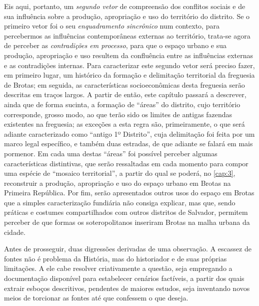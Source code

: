 Eis aqui, portanto, um \textit{segundo vetor} de compreensão dos conflitos sociais e de sua influência sobre a produção, apropriação e uso do território do distrito. Se o primeiro vetor foi o seu \textit{enquadramento sincrônico} num contexto, para percebermos as influências contemporâneas externas ao território, trata-se agora de perceber as \textit{contradições em processo}, para que o espaço urbano e sua produção, apropriação e uso resultem da confluência entre as influências externas e as contradições internas. Para caracterizar este segundo vetor será preciso fazer, em primeiro lugar, um histórico da formação e delimitação territorial da freguesia de Brotas; em seguida, as características socioeconômicas desta freguesia serão descritas em traços largos. A partir de então, este capítulo passará a descrever, ainda que de forma sucinta, a formação de ``áreas'' do distrito, cujo território corresponde, grosso modo, ao que terão sido os limites de antigas fazendas existentes na freguesia; as exceções a esta regra são, primeiramente, o que será adiante caracterizado como ``antigo 1º Distrito'', cuja delimitação foi feita por um marco legal específico, e também duas estradas, de que adiante se falará em mais pormenor. Em cada uma destas ``áreas'' foi possível perceber algumas características distintivas, que serão ressaltadas em cada momento para compor uma espécie de ``mosaico territorial'', a partir do qual se poderá, no \autoref{cap:3}, reconstruir a produção, apropriação e uso do espaço urbano em Brotas na Primeira República. Por fim, serão apresentados outros usos do espaço em Brotas que a simples caracterização fundiária não consiga explicar, mas que, sendo práticas e costumes compartilhados com outros distritos de Salvador, permitem perceber de que formas os soteropolitanos inseriram Brotas na malha urbana da cidade.

Antes de prosseguir, duas digressões derivadas de uma observação. A escassez de fontes não é problema da História, mas do historiador e de suas próprias limitações. A ele cabe resolver criativamente a questão, seja empregando a documentação disponível para estabelecer cenários factíveis, a partir dos quais extrair esboços descritivos, pendentes de maiores estudos, seja inventando novos meios de torcionar as fontes até que confessem o que deseja.

